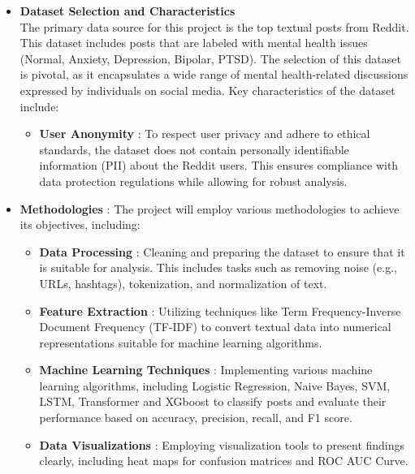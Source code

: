 \begin{itemize}
    \item \textbf{Dataset Selection and Characteristics} \\
    \noindent
    The primary data source for this project is the top textual posts from Reddit. This dataset includes posts that are labeled with mental health issues (Normal, Anxiety, Depression, Bipolar, PTSD). The selection of this dataset is pivotal, as it encapsulates a wide range of mental health-related discussions expressed by individuals on social media. Key characteristics of the dataset include:
    \begin{itemize}
        \item \textbf{User Anonymity} :
        \noindent
        To respect user privacy and adhere to ethical standards, the dataset does not contain personally identifiable information (PII) about the Reddit users. This ensures compliance with data protection regulations while allowing for robust analysis.
    \end{itemize}

    \item \textbf{Methodologies} :
    \noindent
    The project will employ various methodologies to achieve its objectives, including:
    \begin{itemize}
        \item \textbf{Data Processing} :
        \noindent
        Cleaning and preparing the dataset to ensure that it is suitable for analysis. This includes tasks such as removing noise (e.g., URLs, hashtags), tokenization, and normalization of text.
        \item \textbf{Feature Extraction} :
        \noindent
        Utilizing techniques like Term Frequency-Inverse Document Frequency (TF-IDF) to convert textual data into numerical representations suitable for machine learning algorithms.
        \item \textbf{Machine Learning Techniques} :
        \noindent
        Implementing various machine learning algorithms, including Logistic Regression, Naive Bayes, SVM, LSTM, Transformer and XGboost to classify posts and evaluate their performance based on accuracy, precision, recall, and F1 score.
        \item \textbf{Data Visualizations} :
        \noindent
        Employing visualization tools to present findings clearly, including heat maps for confusion matrices and ROC AUC Curve.
    \end{itemize}
\end{itemize}

